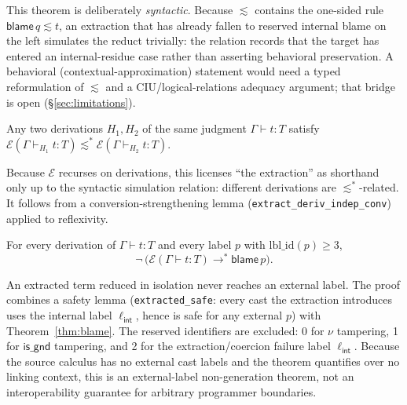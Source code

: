 \documentclass[acmsmall,anonymous=false,nonacm]{acmart}
\newcommand{\blame}[1]{\mathsf{blame}\,#1}
\newcommand{\ext}{\mathcal{E}}
\newcommand{\lint}{\ell_{\mathsf{int}}}
\newcommand{\reducesstar}{\longrightarrow^{*}}
\newcommand{\sepsim}{\mathrel{\lesssim}}
\newcommand{\hastype}[3]{#1 \vdash #2 : #3}
\begin{document}
This theorem is deliberately \emph{syntactic}. Because $\sepsim$ contains the
one-sided rule $\blame q \sepsim t$, an extraction that has already fallen to
reserved internal blame on the left simulates the reduct trivially: the relation
records that the target has entered an internal-residue case rather than
asserting behavioral preservation. A behavioral (contextual-approximation)
statement would need a typed reformulation of $\sepsim$ and a CIU/logical-relations
adequacy argument; that bridge is open (\S\ref{sec:limitations}).

\begin{theorem}
\label{thm:indep}
Any two derivations $H_1, H_2$ of the same judgment $\hastype{\Gamma}{t}{T}$
satisfy $\ext(\Gamma \vdash_{H_1} t : T) \sepsim^{*} \ext(\Gamma \vdash_{H_2} t :
T)$.
\end{theorem}
Because $\ext$ recurses on derivations, this licenses ``the extraction'' as
shorthand only up to the syntactic simulation relation: different derivations
are $\sepsim^{*}$-related. It
follows from a conversion-strengthening lemma
(\texttt{extract\_deriv\_indep\_conv}) applied to reflexivity.

\begin{theorem}
\label{thm:blamefree}
For every derivation of $\hastype{\Gamma}{t}{T}$ and every label $p$ with
$\mathrm{lbl\_id}(p) \ge 3$,
\[
\neg\,\bigl(\ext(\Gamma \vdash t : T) \reducesstar \blame p\bigr).
\]
\end{theorem}
An extracted term reduced in isolation never reaches an external label. The
proof combines a safety lemma (\texttt{extracted\_safe}: every cast the
extraction introduces uses the internal label $\lint$, hence is safe for any
external $p$) with Theorem~\ref{thm:blame}. The reserved identifiers are
excluded: 0 for $\nu$ tampering, 1 for $\mathsf{is\_gnd}$ tampering, and 2 for
the extraction/coercion failure label $\lint$. Because the source calculus has
no external cast labels and the theorem quantifies over no linking context,
this is an external-label non-generation theorem, not an interoperability
guarantee for arbitrary programmer boundaries.
\end{document}
